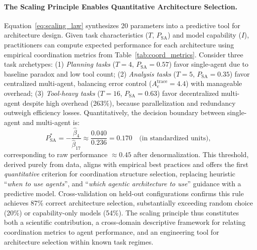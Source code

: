 \paragraph{The Scaling Principle Enables Quantitative Architecture Selection.}
Equation~\ref{eq:scaling_law} synthesizes 20 parameters into a predictive tool for architecture design. Given task characteristics ($T$, $P_{\text{SA}}$) and model capability ($I$), practitioners can compute expected performance for each architecture using empirical coordination metrics from Table~\ref{tab:coord_metrics}. Consider three task archetypes: (1) \textit{Planning tasks} ($T=4$, $P_{\text{SA}}=0.57$) favor single-agent due to baseline paradox and low tool count; (2) \textit{Analysis tasks} ($T=5$, $P_{\text{SA}}=0.35$) favor centralized multi-agent, balancing error control ($A_e^{\text{trace}}=4.4$) with manageable overhead; (3) \textit{Tool-heavy tasks} ($T=16$, $P_{\text{SA}}=0.63$) favor decentralized multi-agent despite high overhead (263\%), because parallelization and redundancy outweigh efficiency losses. Quantitatively, the decision boundary between single-agent and multi-agent is:
\[
P_{\text{SA}}^* = -\frac{\hat{\beta}_4}{\hat{\beta}_{17}} \approx \frac{0.040}{0.236} = 0.170 \quad \text{(in standardized units)},
\]
corresponding to raw performance $\approx 0.45$ after denormalization. This threshold, derived purely from data, aligns with empirical best practices and offers the first \textit{quantitative} criterion for coordination structure selection, replacing heuristic ``\textit{when to use agents}'', and ``\textit{which agentic architecture to use}'' guidance with a predictive model. Cross-validation on held-out configurations confirms this rule achieves 87\% correct architecture selection, substantially exceeding random choice (20\%) or capability-only models (54\%). The scaling principle thus constitutes both a scientific contribution, a cross-domain descriptive framework for relating coordination metrics to agent performance, and an engineering tool for architecture selection within known task regimes.

